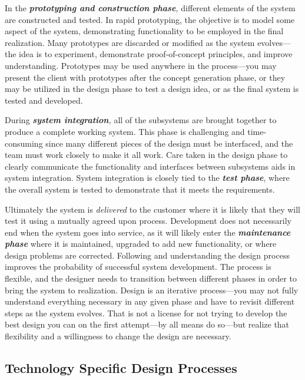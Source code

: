 In the \emph{\textbf{prototyping and construction phase},} different
elements of the system are constructed and tested. In rapid prototyping,
the objective is to model some aspect of the system, demonstrating
functionality to be employed in the final realization. Many prototypes
are discarded or modified as the system evolves---the idea is to
experiment, demonstrate proof-of-concept principles, and improve
understanding. Prototypes may be used anywhere in the process---you may
present the client with prototypes after the concept generation phase,
or they may be utilized in the design phase to test a design idea, or as
the final system is tested and developed.

During \emph{\textbf{system integration},} all of the subsystems are
brought together to produce a complete working system. This phase is
challenging and time-consuming since many different pieces of the design
must be interfaced, and the team must work closely to make it all work.
Care taken in the design phase to clearly communicate the functionality
and interfaces between subsystems aids in system integration. System
integration is closely tied to the \emph{\textbf{test phase}}, where the
overall system is tested to demonstrate that it meets the requirements.

Ultimately the system is \emph{delivered} to the customer where it is
likely that they will test it using a mutually agreed upon process.
Development does not necessarily end when the system goes into service,
as it will likely enter the \emph{\textbf{maintenance phase}} where it
is maintained, upgraded to add new functionality, or where design
problems are corrected. Following and understanding the design process
improves the probability of successful system development. The process
is flexible, and the designer needs to transition between different
phases in order to bring the system to realization. Design is an
iterative process---you may not fully understand everything necessary in
any given phase and have to revisit different steps as the system
evolves. That is not a license for not trying to develop the best design
you can on the first attempt---by all means do so---but realize that
flexibility and a willingness to change the design are necessary.

\subsection{Technology Specific Design Processes}

